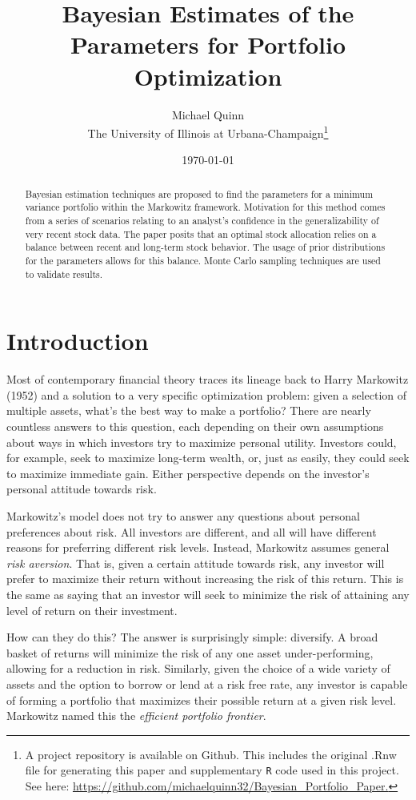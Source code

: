 \documentclass[a4paper]{article}\usepackage[]{graphicx}\usepackage[]{color}
\title{Bayesian Estimates of the Parameters for Portfolio Optimization}
\date{\today}
\author{Michael Quinn \\ The University of Illinois at Urbana-Champaign\footnote{A project repository is available on Github. This includes the original .Rnw file for generating this paper and supplementary \texttt{R} code used in this project. See here: \url{https://github.com/michaelquinn32/Bayesian_Portfolio_Paper.}}}
\begin{document}
\maketitle

\begin{abstract}
Bayesian estimation techniques are proposed to find the parameters for a minimum variance portfolio within the Markowitz framework. Motivation for this method comes from a series of scenarios relating to an analyst's confidence in the generalizability of  very recent stock data. The paper posits that an optimal stock allocation relies on a balance between recent and long-term stock behavior. The usage of prior distributions for the parameters allows for this balance. Monte Carlo sampling techniques are used to validate results.
\end{abstract}

\section{Introduction}

Most of contemporary financial theory traces its lineage back to Harry Markowitz (1952) \cite{mark52} and a solution to a very specific optimization problem: given a selection of multiple assets, what's the best way to make a portfolio? There are nearly countless answers to this question, each depending on their own assumptions about ways in which investors try to maximize personal utility. Investors could, for example, seek to maximize long-term wealth, or, just as easily, they could seek to maximize immediate gain. Either perspective depends on the investor's personal attitude towards risk.

Markowitz's model does not try to answer any questions about personal preferences about risk. All investors are different, and all will have different reasons for preferring different risk levels. Instead, Markowitz assumes general \textit{risk aversion}. That is, given a certain attitude towards risk, any investor will prefer to maximize their return without increasing the risk of this return. This is the same as saying that an investor will seek to minimize the risk of attaining any level of return on their investment.

How can they do this? The answer is surprisingly simple: diversify. A broad basket of returns will minimize the risk of any one asset under-performing, allowing for a reduction in risk. Similarly, given the choice of a wide variety of assets and the option to borrow or lend at a risk free rate, any investor is capable of forming a portfolio that maximizes their possible return at a given risk level. Markowitz named this the \textit{efficient portfolio frontier}.
\end{document}

